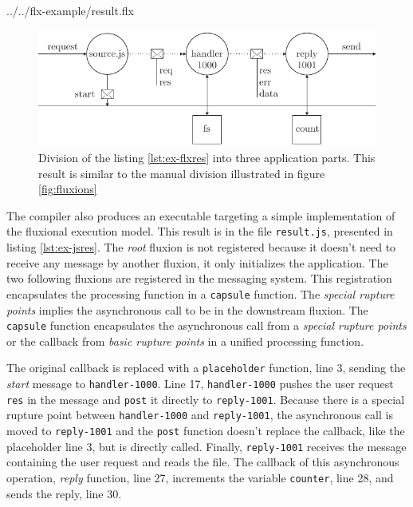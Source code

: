 {../../flx-example/result.flx}

\begin{figure}[h!]
\begin{center}
  \includegraphics[width=\linewidth]{ressources/flux-3.pdf}
  \caption{Division of the listing \ref{lst:ex-flxres} into three application parts. This result is similar to the manual division illustrated in figure \ref{fig:fluxions}}
  \label{fig:flux-3}
\end{center}
\end{figure}

The compiler also produces an executable targeting a simple implementation of the fluxional execution model.
This result is in the file \texttt{result.js}, presented in listing \ref{lst:ex-jsres}.
The \textit{root} fluxion is not registered because it doesn't need to receive any message by another fluxion, it only initializes the application.
The two following fluxions are registered in the messaging system.
This registration encapsulates the processing function in a \texttt{capsule} function.
The \textit{special rupture points} implies the asynchronous call to be in the downstream fluxion.
The \texttt{capsule} function encapsulates the asynchronous call from a \textit{special rupture points} or the callback from \textit{basic rupture points} in a unified processing function.

The original callback is replaced with a \texttt{placeholder} function, line 3, sending the \textit{start} message to \texttt{handler-1000}.
Line 17, \texttt{handler-1000} pushes the user request \texttt{res} in the message and \texttt{post} it directly to \texttt{reply-1001}.
Because there is a special rupture point between \texttt{handler-1000} and \texttt{reply-1001}, the asynchronous call is moved to \texttt{reply-1001} and the \texttt{post} function doesn't replace the callback, like the placeholder line 3, but is directly called.
Finally, \texttt{reply-1001} receives the message containing the user request and reads the file.
The callback of this asynchronous operation, \textit{reply} function, line 27, increments the variable \texttt{counter}, line 28, and sends the reply, line 30.

